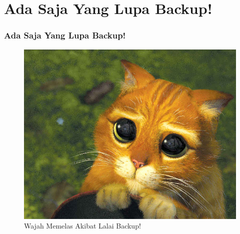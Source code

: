 \documentclass[xcolor=table, notheorems, hyperref={pdfpagelabels=false}]{beamer}
\begin{document}
\section{Ada Saja Yang Lupa Backup!}
\begin{frame}[fragile]
\frametitle{Ada Saja Yang Lupa Backup!}
\begin{figure}
\includegraphics[width=0.74\linewidth]{puss-in-boot}
\caption{Wajah Memelas Akibat Lalai Backup!}
\end{figure}
\end{frame}
\end{document}
